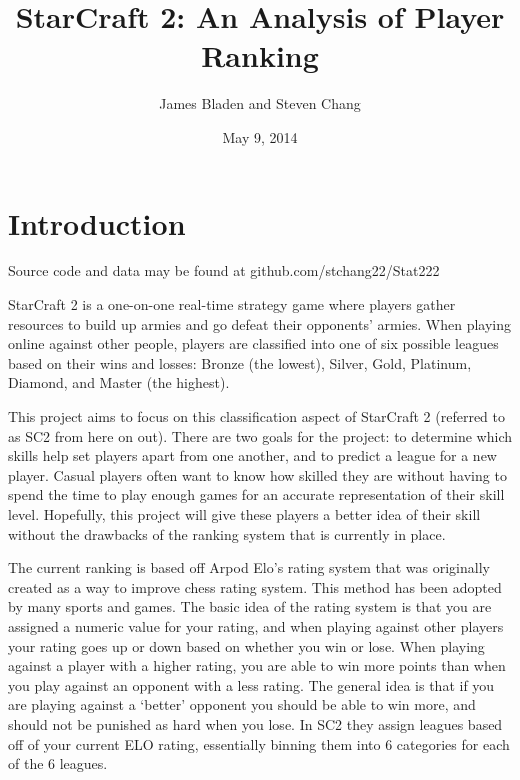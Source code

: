 \documentclass[letterpaper,10pt,english]{/usr/share/sphinx/texinputs/sphinxhowto}
\title{StarCraft 2: An Analysis of Player Ranking}
\date{May 9, 2014}
\author{James Bladen and Steven Chang}
\begin{document}
        
            \maketitle
        

        


        
        \part{Introduction}Source code and data may be found at github.com/stchang22/Stat222

StarCraft 2 is a one-on-one real-time strategy game where players gather
resources to build up armies and go defeat their opponents' armies. When
playing online against other people, players are classified into one of
six possible leagues based on their wins and losses: Bronze (the
lowest), Silver, Gold, Platinum, Diamond, and Master (the highest).

This project aims to focus on this classification aspect of StarCraft 2
(referred to as SC2 from here on out). There are two goals for the
project: to determine which skills help set players apart from one
another, and to predict a league for a new player. Casual players often
want to know how skilled they are without having to spend the time to
play enough games for an accurate representation of their skill level.
Hopefully, this project will give these players a better idea of their
skill without the drawbacks of the ranking system that is currently in
place.

The current ranking is based off Arpod Elo's rating system that was
originally created as a way to improve chess rating system. This method
has been adopted by many sports and games. The basic idea of the rating
system is that you are assigned a numeric value for your rating, and
when playing against other players your rating goes up or down based on
whether you win or lose. When playing against a player with a higher
rating, you are able to win more points than when you play against an
opponent with a less rating. The general idea is that if you are playing
against a `better' opponent you should be able to win more, and should
not be punished as hard when you lose. In SC2 they assign leagues based
off of your current ELO rating, essentially binning them into 6
categories for each of the 6 leagues.
\end{document}
